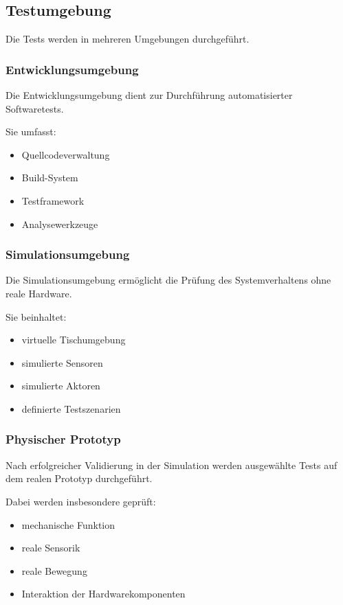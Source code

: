\subsection{Testumgebung}\label{testumgebung}

Die Tests werden in mehreren Umgebungen durchgeführt.

\subsubsection{Entwicklungsumgebung}\label{entwicklungsumgebung}

Die Entwicklungsumgebung dient zur Durchführung automatisierter
Softwaretests.

Sie umfasst:

\begin{itemize}
\tightlist
\item
  Quellcodeverwaltung
\item
  Build-System
\item
  Testframework
\item
  Analysewerkzeuge
\end{itemize}

\subsubsection{Simulationsumgebung}\label{simulationsumgebung}

Die Simulationsumgebung ermöglicht die Prüfung des Systemverhaltens ohne
reale Hardware.

Sie beinhaltet:

\begin{itemize}
\tightlist
\item
  virtuelle Tischumgebung
\item
  simulierte Sensoren
\item
  simulierte Aktoren
\item
  definierte Testszenarien
\end{itemize}

\subsubsection{Physischer Prototyp}\label{physischer-prototyp}

Nach erfolgreicher Validierung in der Simulation werden ausgewählte
Tests auf dem realen Prototyp durchgeführt.

Dabei werden insbesondere geprüft:

\begin{itemize}
\tightlist
\item
  mechanische Funktion
\item
  reale Sensorik
\item
  reale Bewegung
\item
  Interaktion der Hardwarekomponenten
\end{itemize}

